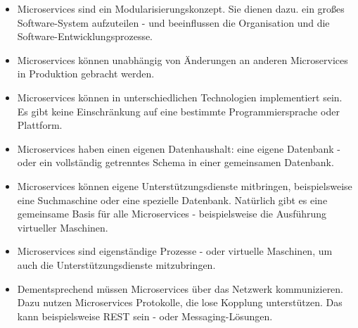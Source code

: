 \begin{itemize}
    \item Microservices sind ein Modularisierungskonzept. Sie dienen dazu. ein großes Software-System aufzuteilen - und beeinflussen die Organisation und die Software-Entwicklungsprozesse.
    \item Microservices können unabhängig von Änderungen an anderen Microservices in Produktion gebracht werden.
    \item Microservices können in unterschiedlichen Technologien implementiert sein. Es gibt keine Einschränkung auf eine bestimmte Programmiersprache oder Plattform.
    \item Microservices haben einen eigenen Datenhaushalt: eine eigene Datenbank - oder ein vollständig getrenntes Schema in einer gemeinsamen Datenbank.
    \item Microservices können eigene Unterstützungsdienste mitbringen, beispielsweise eine Suchmaschine oder eine spezielle Datenbank. Natürlich gibt es eine gemeinsame Basis für alle Microservices - beispielsweise die Ausführung virtueller Maschinen.
    \item Microservices sind eigenständige Prozesse - oder virtuelle Maschinen, um auch die Unterstützungsdienste mitzubringen.
    \item Dementsprechend müssen Microservices über das Netzwerk kommunizieren. Dazu nutzen Microservices Protokolle, die lose Kopplung unterstützen. Das kann beispielsweise REST sein - oder Messaging-Lösungen.
\end{itemize}

